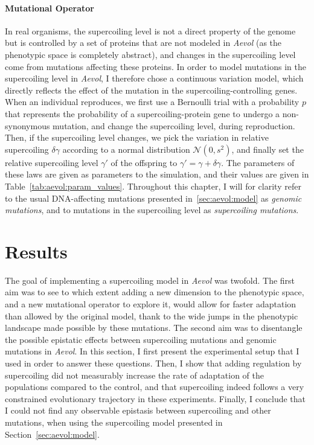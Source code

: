 \paragraph{Mutational Operator}
In real organisms, the supercoiling level is not a direct property of the genome but is controlled by a set of proteins that are not modeled in \emph{Aevol} (as the phenotypic space is completely abstract), and changes in the supercoiling level come from mutations affecting these proteins.
In order to model mutations in the supercoiling level in \emph{Aevol}, I therefore chose a continuous variation model, which directly reflects the effect of the mutation in the supercoiling-controlling genes.
When an individual reproduces, we first use a Bernoulli trial with a probability $p$ that represents the probability of a supercoiling-protein gene to undergo a non-synonymous mutation, and change the supercoiling level, during reproduction.
Then, if the supercoiling level changes, we pick the variation in relative supercoiling $\delta\gamma$ according to a normal distribution $\mathcal{N}(0, s^2)$, and finally set the relative supercoiling level $\gamma'$ of the offspring to $\gamma' = \gamma + \delta\gamma$.
The parameters of these laws are given as parameters to the simulation, and their values are given in Table~\ref{tab:aevol:param_values}.
Throughout this chapter, I will for clarity refer to the usual DNA-affecting mutations presented in~\ref{sec:aevol:model} as \emph{genomic mutations}, and to mutations in the supercoiling level as \emph{supercoiling mutations}.


\section{Results}
\label{sec:aevol:results}

The goal of implementing a supercoiling model in \emph{Aevol} was twofold.
The first aim was to see to which extent adding a new dimension to the phenotypic space, and a new mutational operator to explore it, would allow for faster adaptation than allowed by the original model, thank to the wide jumps in the phenotypic landscape made possible by these mutations.
The second aim was to disentangle the possible epistatic effects between supercoiling mutations and genomic mutations in \emph{Aevol}.
In this section, I first present the experimental setup that I used in order to answer these questions.
Then, I show that adding regulation by supercoiling did not measurably increase the rate of adaptation of the populations compared to the control, and that supercoiling indeed follows a very constrained evolutionary trajectory in these experiments.
Finally, I conclude that I could not find any observable epistasis between supercoiling and other mutations, when using the supercoiling model presented in Section~\ref{sec:aevol:model}.

